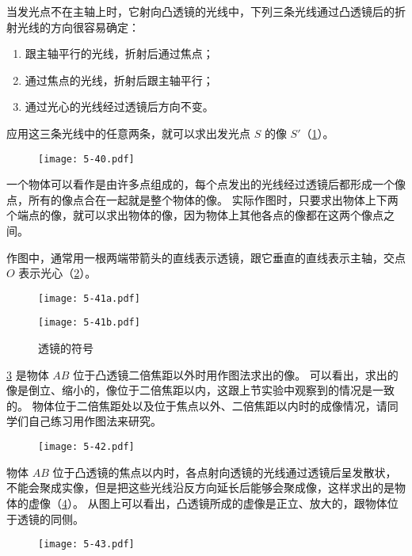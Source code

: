 当发光点不在主轴上时，它射向凸透镜的光线中，下列三条光线通过凸透镜后的折射光线的方向很容易确定：
\begin{enumerate}
  \item 跟主轴平行的光线，折射后通过焦点；
  \item 通过焦点的光线，折射后跟主轴平行；
  \item 通过光心的光线经过透镜后方向不变。
\end{enumerate}

应用这三条光线中的任意两条，就可以求出发光点 $S$ 的像 $S'$（\cref{fig:5-40}）。
\begin{figure}
  \texttt{[image: 5-40.pdf]}
  \caption{}\label{fig:5-40}
\end{figure}

一个物体可以看作是由许多点组成的，每个点发出的光线经过透镜后都形成一个像点，所有的像点合在一起就是整个物体的像。
实际作图时，只要求出物体上下两个端点的像，就可以求出物体的像，因为物体上其他各点的像都在这两个像点之间。

作图中，通常用一根两端带箭头的直线表示透镜，跟它垂直的直线表示主轴，交点 $O$ 表示光心（\cref{fig:5-41}）。
\begin{figure}
\begin{minipage}{0.4\linewidth}\centering
  \texttt{[image: 5-41a.pdf]}
  \label{fig:5-41a}
\end{minipage}
\begin{minipage}{0.4\linewidth}\centering
  \texttt{[image: 5-41b.pdf]}
  \label{fig:5-41b}
\end{minipage}
    \caption{透镜的符号}\label{fig:5-41}
\end{figure}

\cref{fig:5-42} 是物体 $AB$ 位于凸透镜二倍焦距以外时用作图法求出的像。
可以看出，求出的像是倒立、缩小的，像位于二倍焦距以内，这跟上节实验中观察到的情况是一致的。
物体位于二倍焦距处以及位于焦点以外、二倍焦距以内时的成像情况，请同学们自己练习用作图法来研究。
\begin{figure}
  \texttt{[image: 5-42.pdf]}
  \caption{}\label{fig:5-42}
\end{figure}

物体 $AB$ 位于凸透镜的焦点以内时，各点射向透镜的光线通过透镜后呈发散状，不能会聚成实像，但是把这些光线沿反方向延长后能够会聚成像，这样求出的是物体的虚像（\cref{fig:5-43}）。
从图上可以看出，凸透镜所成的虚像是正立、放大的，跟物体位于透镜的同侧。

\begin{figure}
  \texttt{[image: 5-43.pdf]}
  \caption{}\label{fig:5-43}
\end{figure}

